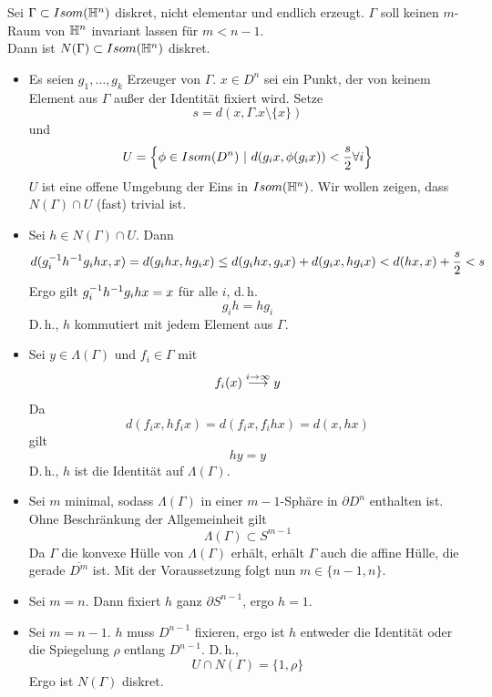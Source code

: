 \documentclass{book}
\begin{document}
\Lem{}
Sei $\Gamma \subset Isom(\mathbb{H}^n)$ diskret, nicht elementar und endlich erzeugt. $\Gamma$ soll keinen $m$-Raum von $\mathbb{H}^n$ invariant lassen für $m < n- 1$.\\
Dann ist $N(\Gamma)\subset Isom(\mathbb{H}^n)$ diskret.
\begin{Beweis}{}
\begin{itemize}
	\item 	Es seien $g_1,\ldots, g_k$ Erzeuger von $\Gamma$. $x \in D^n$ sei ein Punkt, der von keinem Element aus $\Gamma$ außer der Identität fixiert wird. Setze
	\[ s = d(x, \Gamma.x \setminus \{x\}) \]
	und
	\[ U = \set{\phi \in Isom(D^n)}{d(g_ix, \phi(g_ix)) < \frac{s}{2} \forall i } \]
	$U$ ist eine offene Umgebung der Eins in $Isom(\mathbb{H}^n)$. Wir wollen zeigen, dass $N(\Gamma) \cap U$ (fast) trivial ist.
	\item Sei $h \in N(\Gamma) \cap U$. Dann
	\begin{align*}
	d(g_i^{-1} h^{-1} g_i h x, x) = d(g_i h x, h g_i x) \leq d(g_i h x, g_i x) + d(g_i x, h g_i x) < d(hx, x) + \frac{s}{2} < s
	\end{align*}
	Ergo gilt $g_i^{-1} h^{-1} g_i h x = x$ für alle $i$, d.\,h.
	\[ g_i h = h g_i \]
	D.\,h., $h$ kommutiert mit jedem Element aus $\Gamma$.
	\item Sei $y \in \Lambda(\Gamma)$ und $f_i \in \Gamma$ mit
	\[ f_i(x) \overset{i\overset{}{\rightarrow} \infty}{\longrightarrow} y  \]
	Da
	\[ d(f_i x, hf_i x) = d(f_i x, f_i h x ) = d(x, hx) \]
	gilt
	\[  hy = y  \]
	D.\,h., $h$ ist die Identität auf $\Lambda(\Gamma)$.
	\item Sei $m$ minimal, sodass $\Lambda(\Gamma)$ in einer $m-1$-Sphäre in $\partial D^n$ enthalten ist. Ohne Beschränkung der Allgemeinheit gilt
	\[ \Lambda(\Gamma) \subset S^{m-1} \]
	Da $\Gamma$ die konvexe Hülle von $\Lambda(\Gamma)$ erhält, erhält $\Gamma$ auch die affine Hülle, die gerade $\overline{D^m}$ ist. Mit der Voraussetzung folgt nun $m \in \{n-1,n\}$.
	\item Sei $m = n$. Dann fixiert $h$ ganz $\partial S^{n-1}$, ergo $h = 1$.
	\item Sei $m = n-1$. $h$ muss $D^{n-1}$ fixieren, ergo ist $h$ entweder die Identität oder die Spiegelung $\rho$ entlang $D^{n-1}$. D.\,h.,
	\[ U \cap N(\Gamma) = \{1, \rho\} \]
	Ergo ist $N(\Gamma)$ diskret.
\end{itemize}
\end{Beweis}
\end{document}
